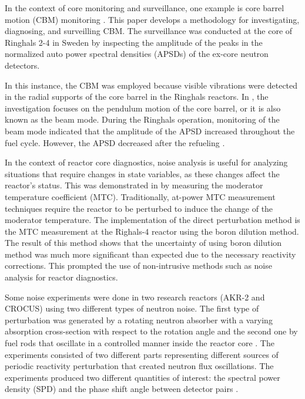 In the context of core monitoring and surveillance, one example is core barrel motion (CBM) monitoring \cite{pazsitDevelopmentsCoreBarrelMotion2016}. This paper develops a methodology for investigating, diagnosing, and surveilling CBM. The surveillance was conducted at the core of Ringhals 2-4 in Sweden by inspecting the amplitude of the peaks in the normalized auto power spectral densities (APSDs) of the ex-core neutron detectors.

In this instance, the CBM was employed because visible vibrations were detected in the radial supports of the core barrel in the Ringhals reactors. In \cite{martinSURVEILLANCEDIAGNOSTICSBEAM2012}, the investigation focuses on the pendulum motion of the core barrel, or it is also known as the beam mode. During the Ringhals operation, monitoring of the beam mode indicated that the amplitude of the APSD increased throughout the fuel cycle. However, the APSD decreased after the refueling \cite{pazsitFinalReportResearch2011}. 

In the context of reactor core diagnostics, noise analysis is useful for analyzing situations that require changes in state variables, as these changes affect the reactor's status. This was demonstrated in \cite{demaziereDevelopmentNonintrusiveMethod2002} by measuring the moderator temperature coefficient (MTC). Traditionally, at-power MTC measurement techniques require the reactor to be perturbed to induce the change of the moderator temperature. The implementation of the direct perturbation method is the MTC measurement at the Righals-4 reactor using the boron dilution method. The result of this method shows that the uncertainty of using boron dilution method was much more significant than expected due to the necessary reactivity corrections. This prompted the use of non-intrusive methods such as noise analysis for reactor diagnostics.

Some noise experiments were done in two research reactors (AKR-2 and CROCUS) using two different types of neutron noise. The first type of perturbation was generated by a rotating neutron absorber with a varying absorption cross-section with respect to the rotation angle and the second one by fuel rods that oscillate in a controlled manner inside the reactor core \cite{lamirandExperimentalReport1st2018, lamirandExperimentalReport2nd2021, lamirandExperimentalReport3rd2021}. The experiments consisted of two different parts representing different sources of periodic reactivity perturbation that created neutron flux oscillations. The experiments produced two different quantities of interest: the spectral power density (SPD) and the phase shift angle between detector pairs \cite{ambrozicNoiseAnalysisTechniques2020}. 

